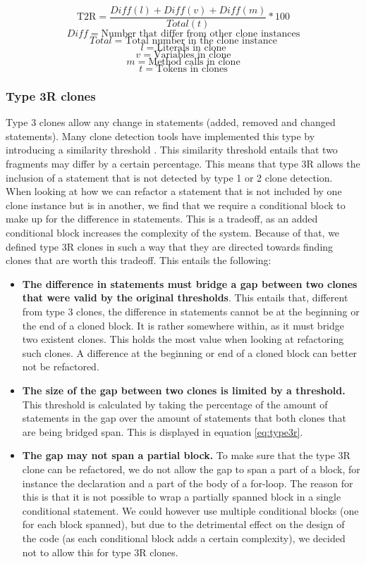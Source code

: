 \documentclass[a4paper]{article}
\begin{document}
\begin{equation}\label{eq:type2r}
\text{T2R}=\frac{Diff(l) + Diff(v) + Diff(m)}{Total(t)}*100
\end{equation}
$$Diff = \text{Number that differ from other clone instances}$$
$$Total = \text{Total number in the clone instance}$$
$$l = \text{Literals in clone}$$
$$v = \text{Variables in clone}$$
$$m = \text{Method calls in clone}$$
$$t = \text{Tokens in clones}$$

\subsubsection{Type 3R clones}
Type 3 clones allow any change in statements (added, removed and changed statements). Many clone detection tools have implemented this type by introducing a similarity threshold \cite{roy2008nicad,ragkhitwetsagul2019siamese,jiang2007deckard,semura2017ccfindersw}. This similarity threshold entails that two fragments may differ by a certain percentage. This means that type 3R allows the inclusion of a statement that is not detected by type 1 or 2 clone detection. When looking at how we can refactor a statement that is not included by one clone instance but is in another, we find that we require a conditional block to make up for the difference in statements. This is a tradeoff, as an added conditional block increases the complexity of the system. Because of that, we defined type 3R clones in such a way that they are directed towards finding clones that are worth this tradeoff. This entails the following:

\begin{itemize}
  \item \textbf{The difference in statements must bridge a gap between two clones that were valid by the original thresholds}. This entails that, different from type 3 clones, the difference in statements cannot be at the beginning or the end of a cloned block. It is rather somewhere within, as it must bridge two existent clones. This holds the most value when looking at refactoring such clones. A difference at the beginning or end of a cloned block can better not be refactored.
  \item \textbf{The size of the gap between two clones is limited by a threshold.} This threshold is calculated by taking the percentage of the amount of statements in the gap over the amount of statements that both clones that are being bridged span. This is displayed in equation \ref{eq:type3r}.
  \item \textbf{The gap may not span a partial block.} To make sure that the type 3R clone can be refactored, we do not allow the gap to span a part of a block, for instance the declaration and a part of the body of a for-loop. The reason for this is that it is not possible to wrap a partially spanned block in a single conditional statement. We could however use multiple conditional blocks (one for each block spanned), but due to the detrimental effect on the design of the code (as each conditional block adds a certain complexity), we decided not to allow this for type 3R clones.
\end{itemize}
\end{document}
